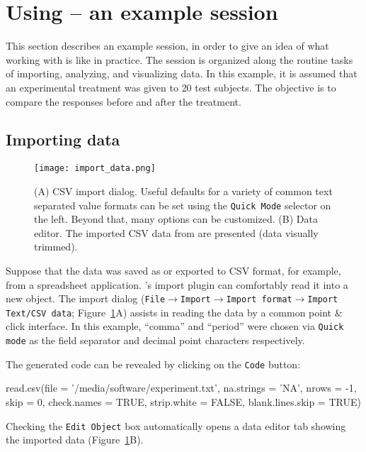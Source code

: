 \section[Using RKWard -- an example session]{Using  -- an example session}
\label{sec:using_RKWard}
This section describes an example  session, in order to give an idea
of what working with  is like in practice.
The session is organized along the routine tasks of importing,
analyzing, and visualizing data. In this example, it is assumed that an experimental
treatment was given to 20 test subjects. The objective is to compare the responses 
before and after the treatment. 

\subsection{Importing data}
\label{sec:importing_data}
\begin{figure}[b!]
 \centering
 \texttt{[image: import\_data.png]}
 \caption{(A) CSV import dialog. Useful defaults for a variety of common text separated value formats can
  be set using the \texttt{Quick Mode} selector on the left. Beyond that, many options can be customized. (B) Data editor. The imported CSV
  data from  are presented (data visually trimmed).}
 \label{fig:import_data}
\end{figure}

Suppose that the data was saved as or exported to CSV format, for example, from a 
spreadsheet application. 's import plugin can
comfortably read it into a new  object.
The import dialog (\texttt{File$\rightarrow$Import$\rightarrow$Import
format$\rightarrow$Import Text/CSV data}; Figure~\ref{fig:import_data}A) assists in reading the
data by a common point \& click interface. In this
example, ``comma'' and ``period'' were chosen via \texttt{Quick mode} as the field
separator and decimal point characters respectively.

The generated  code can be revealed by clicking on the \texttt{Code} button:

\begin{Code}
read.csv(file = '/media/software/experiment.txt',
         na.strings = 'NA', nrows = -1, skip = 0,
         check.names = TRUE, strip.white = FALSE, blank.lines.skip = TRUE)
\end{Code}

Checking the \texttt{Edit Object} box automatically opens a data editor tab
showing the imported data (Figure~\ref{fig:import_data}B).

